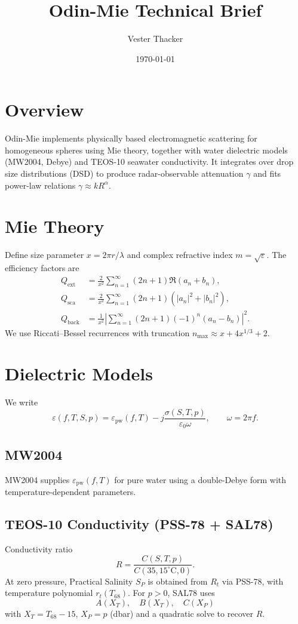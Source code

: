 \documentclass[11pt]{article}
\title{Odin-Mie Technical Brief}
\author{Vester Thacker}
\date{\today}
\begin{document}
\maketitle

\section{Overview}
Odin-Mie implements physically based electromagnetic scattering for homogeneous spheres using Mie theory,
together with water dielectric models (MW2004, Debye) and TEOS-10 seawater conductivity. It integrates
over drop size distributions (DSD) to produce radar-observable attenuation $\gamma$ and fits power-law
relations $\gamma \approx k R^\alpha$.

\section{Mie Theory}
Define size parameter $x = 2\pi r/\lambda$ and complex refractive index $m=\sqrt{\varepsilon}$.
The efficiency factors are
\begin{align}
Q_{\mathrm{ext}} &= \frac{2}{x^2}\sum_{n=1}^{\infty} (2n+1)\Re(a_n + b_n), \\
Q_{\mathrm{sca}} &= \frac{2}{x^2}\sum_{n=1}^{\infty} (2n+1)(|a_n|^2 + |b_n|^2), \\
Q_{\mathrm{back}} &= \frac{1}{x^2}\left|\sum_{n=1}^{\infty} (2n+1)(-1)^n (a_n - b_n)\right|^2.
\end{align}
We use Riccati--Bessel recurrences with truncation $n_{\max}\approx x + 4x^{1/3} + 2$.

\section{Dielectric Models}
We write
\begin{equation}
\varepsilon(f,T,S,p) = \varepsilon_{\mathrm{pw}}(f,T) - j \frac{\sigma(S,T,p)}{\varepsilon_0 \omega}, \qquad \omega=2\pi f.
\end{equation}
\subsection{MW2004}
MW2004 supplies $\varepsilon_{\mathrm{pw}}(f,T)$ for pure water using a double-Debye form with temperature-dependent parameters.

\subsection{TEOS-10 Conductivity (PSS-78 + SAL78)}
Conductivity ratio
\begin{equation}
R = \frac{C(S,T,p)}{C(35,15^\circ\mathrm{C},0)}.
\end{equation}
At zero pressure, Practical Salinity $S_P$ is obtained from $R_t$ via PSS-78, with temperature polynomial $r_t(T_{68})$.
For $p>0$, SAL78 uses
\begin{equation}
A(X_T), \quad B(X_T), \quad C(X_P)
\end{equation}
with $X_T = T_{68}-15$, $X_P=p$ (dbar) and a quadratic solve to recover $R$.
\end{document}
